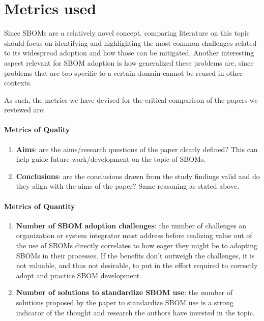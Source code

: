 \section{Metrics used} \label{metrics}

Since SBOMs are a relatively novel concept, comparing literature on this topic should focus on identifying and highlighting the most common challenges related to its widespread adoption and how those can be mitigated. Another interesting aspect relevant for SBOM adoption is how generalized these problems are, since problems that are too specific to a certain domain cannot be reused in other contexts.

As such, the metrics we have devised for the critical comparison of the papers we reviewed are:

\paragraph{Metrics of Quality}
\begin{enumerate}
    \item \textbf{Aims}: are the aims/research questions of the paper clearly defined? This can help guide future work/development on the topic of SBOMs.
    \item \textbf{Conclusions}: are the conclusions drawn from the study findings valid and do they align with the aims of the paper? Same reasoning as stated above.

    \setcounter{metrics}{\value{enumi}}
\end{enumerate}

\paragraph{Metrics of Quantity}
\begin{enumerate}
    \setcounter{enumi}{\value{metrics}}

    \item \textbf{Number of SBOM adoption challenges}: the number of challenges an organization or system integrator must address before realizing value out of the use of SBOMs directly correlates to how eager they might be to adopting SBOMs in their processes. If the benefits don't outweigh the challenges, it is not valuable, and thus not desirable, to put in the effort required to correctly adopt and practice SBOM development.
    \item \textbf{Number of solutions to standardize SBOM use}: the number of solutions proposed by the paper to standardize SBOM use is a strong indicator of the thought and research the authors have invested in the topic.

    \setcounter{metrics}{\value{enumi}}
\end{enumerate}

